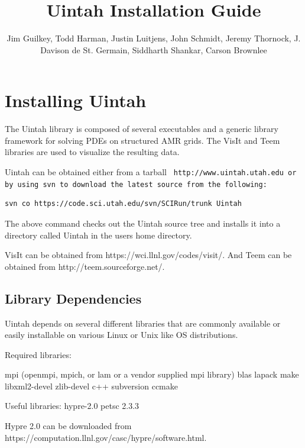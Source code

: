 \documentclass[12pt]{report}
\begin{document}
\title{Uintah Installation Guide}

\author{Jim Guilkey, Todd Harman, Justin Luitjens, John Schmidt,
  Jeremy Thornock, J. Davison de St. Germain, Siddharth Shankar,
  Carson Brownlee}

\maketitle

\tableofcontents

\newpage

\chapter{Installing Uintah} \label{Sec:installation}

The Uintah library is composed of several executables and a generic
library framework for solving PDEs on structured AMR grids.  The VisIt
and Teem libraries are used to visualize the resulting data.

Uintah can be obtained either from a tarball \tt
http://www.uintah.utah.edu \normalfont or by using svn to download the
latest source from the following:

\begin{Verbatim}[fontsize=\footnotesize]
  svn co https://code.sci.utah.edu/svn/SCIRun/trunk Uintah
\end{Verbatim}

The above command checks out the Uintah source tree and installs it
into a directory called Uintah in the users home directory.

VisIt can be obtained from https://wci.llnl.gov/codes/visit/. And Teem
can be obtained from http://teem.sourceforge.net/.

\section{Library Dependencies}

Uintah depends on several different libraries that are commonly
available or easily installable on various Linux or Unix like OS
distributions.  

Required libraries:

mpi (openmpi, mpich, or lam or a vendor supplied mpi library)
blas
lapack
make
libxml2-devel
zlib-devel
c++
subversion
ccmake

Useful libraries:
hypre-2.0
petsc 2.3.3

Hypre 2.0 can be downloaded from
https://computation.llnl.gov/casc/hypre/software.html.
\end{document}
